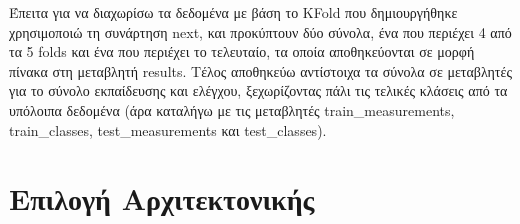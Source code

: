 \documentclass[12pt,a4paper]{article}
\begin{document}
Έπειτα για να διαχωρίσω τα δεδομένα με βάση το KFold που δημιουργήθηκε χρησιμοποιώ τη συνάρτηση next, και προκύπτουν δύο σύνολα, ένα που περιέχει 4 από τα 5 folds και ένα που περιέχει το τελευταίο, τα οποία αποθηκεύονται σε μορφή πίνακα στη μεταβλητή results. Τέλος αποθηκεύω αντίστοιχα τα σύνολα σε μεταβλητές για το σύνολο εκπαίδευσης και ελέγχου, ξεχωρίζοντας πάλι τις τελικές κλάσεις από τα υπόλοιπα δεδομένα (άρα καταλήγω με τις μεταβλητές train\_measurements, train\_classes, test\_measurements και test\_classes).

\section{Επιλογή Αρχιτεκτονικής}
\label{Επιλογή Αρχιτεκτονικής}
\end{document}
